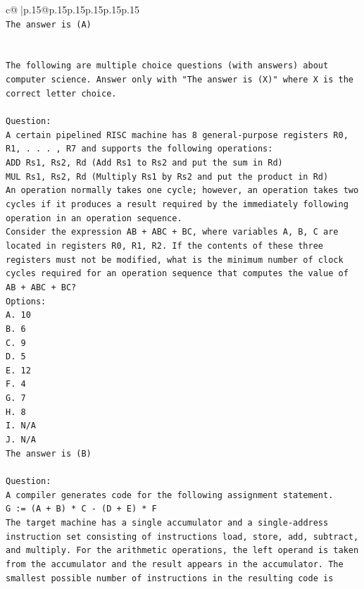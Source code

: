 \documentclass{article}
\begin{document}
{\begin{supertabular}{c@{$\;$}|p{.15\linewidth}@{}p{.15\linewidth}p{.15\linewidth}p{.15\linewidth}p{.15\linewidth}p{.15\linewidth}}
{{{\\ 
\texttt{The answer is (A)} \\
\\ 
\\ 
\texttt{The following are multiple choice questions (with answers) about computer science. Answer only with "The answer is (X)" where X is the correct letter choice.} \\
\\ 
\texttt{Question:} \\
\texttt{A certain pipelined RISC machine has 8 general{-}purpose registers R0, R1, . . . , R7 and supports the following operations:} \\
\texttt{ADD Rs1, Rs2, Rd (Add Rs1 to Rs2 and put the sum in Rd)} \\
\texttt{MUL Rs1, Rs2, Rd (Multiply Rs1 by Rs2 and put the product in Rd)} \\
\texttt{An operation normally takes one cycle; however, an operation takes two cycles if it produces a result required by the immediately following operation in an operation sequence.} \\
\texttt{Consider the expression AB + ABC + BC, where variables A, B, C are located in registers R0, R1, R2. If the contents of these three registers must not be modified, what is the minimum number of clock cycles required for an operation sequence that computes the value of AB + ABC + BC?} \\
\texttt{Options:} \\
\texttt{A. 10} \\
\texttt{B. 6} \\
\texttt{C. 9} \\
\texttt{D. 5} \\
\texttt{E. 12} \\
\texttt{F. 4} \\
\texttt{G. 7} \\
\texttt{H. 8} \\
\texttt{I. N/A} \\
\texttt{J. N/A} \\
\texttt{The answer is (B)} \\
\\ 
\texttt{Question:} \\
\texttt{A compiler generates code for the following assignment statement.} \\
\texttt{G := (A + B) * C {-} (D + E) * F} \\
\texttt{The target machine has a single accumulator and a single{-}address instruction set consisting of instructions load, store, add, subtract, and multiply. For the arithmetic operations, the left operand is taken from the accumulator and the result appears in the accumulator. The smallest possible number of instructions in the resulting code is} \\
}}}
\end{supertabular}}
\end{document}
